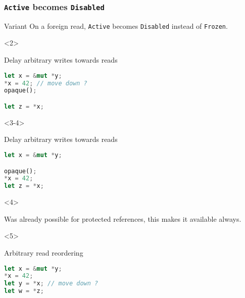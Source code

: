 \begin{frame}[fragile, t]
    \frametitle{\texttt{Active} becomes \texttt{Disabled}}

    \begin{exampleblock}{Variant}
        On a foreign read, \texttt{Active} becomes \texttt{Disabled} instead of \texttt{Frozen}.
    \end{exampleblock}


    \begin{onlyenv}<2>
        \begin{block}{{\cmark} Delay arbitrary writes towards reads}
            \begin{lstlisting}[language=rust, basicstyle=\ttfamily\scriptsize]
let x = &mut *y;
*x = 42; // move down ?
opaque();

let z = *x;
            \end{lstlisting}
        \end{block}
    \end{onlyenv}

    \begin{onlyenv}<3-4>
        \begin{block}{{\cmark} Delay arbitrary writes towards reads}
            \begin{lstlisting}[language=rust, basicstyle=\ttfamily\scriptsize]
let x = &mut *y;

opaque();
*x = 42;
let z = *x;
            \end{lstlisting}
        \end{block}
    \end{onlyenv}

    \begin{onlyenv}<4>
        \begin{block}{}
            Was already possible for protected references,
            this makes it available always.
        \end{block}
    \end{onlyenv}


    \begin{onlyenv}<5>
        \begin{block}{{\xmark} Arbitrary read reordering}
            \begin{lstlisting}[language=rust]
let x = &mut *y;
*x = 42;
let y = *x; // move down ?
let w = *z;

            \end{lstlisting}
        \end{block}
    \end{onlyenv}


\end{frame}
